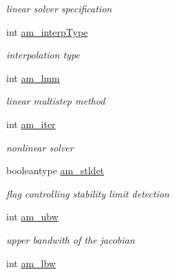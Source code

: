 \begin{DoxyCompactItemize}
\begin{DoxyCompactList}\small\item\em linear solver specification \end{DoxyCompactList}\item 
int \hyperlink{struct_user_data_a02adc800558b1cdac3fa8bc96e65dbbb}{am\+\_\+interp\+Type}
\begin{DoxyCompactList}\small\item\em interpolation type \end{DoxyCompactList}\item 
int \hyperlink{struct_user_data_a18b6fbc6159783acab9b5f4b106077cd}{am\+\_\+lmm}
\begin{DoxyCompactList}\small\item\em linear multistep method \end{DoxyCompactList}\item 
int \hyperlink{struct_user_data_a2e0183eade68209e6835d3199054f0cc}{am\+\_\+iter}
\begin{DoxyCompactList}\small\item\em nonlinear solver \end{DoxyCompactList}\item 
\hypertarget{struct_user_data_a7d39c238c319f0164a15744950bfd021}{}booleantype \hyperlink{struct_user_data_a7d39c238c319f0164a15744950bfd021}{am\+\_\+stldet}\label{struct_user_data_a7d39c238c319f0164a15744950bfd021}

\begin{DoxyCompactList}\small\item\em flag controlling stability limit detection \end{DoxyCompactList}\item 
\hypertarget{struct_user_data_a7283826ef630f92bb04052eb79a377e5}{}int \hyperlink{struct_user_data_a7283826ef630f92bb04052eb79a377e5}{am\+\_\+ubw}\label{struct_user_data_a7283826ef630f92bb04052eb79a377e5}

\begin{DoxyCompactList}\small\item\em upper bandwith of the jacobian \end{DoxyCompactList}\item 
\hypertarget{struct_user_data_a0fd271dea83e804c7b1ef82a2b0ab76c}{}int \hyperlink{struct_user_data_a0fd271dea83e804c7b1ef82a2b0ab76c}{am\+\_\+lbw}\label{struct_user_data_a0fd271dea83e804c7b1ef82a2b0ab76c}


\end{DoxyCompactItemize}

